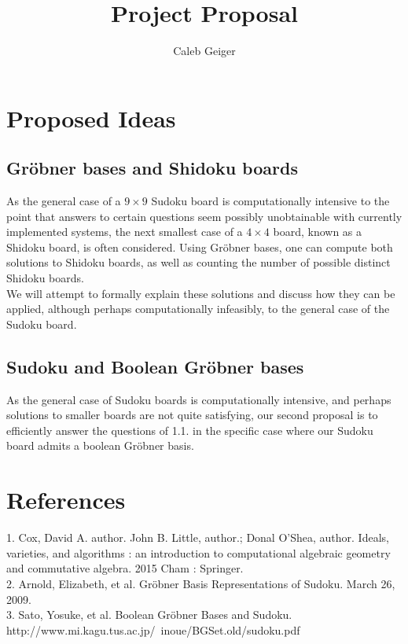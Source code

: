 \documentclass{article}
\title{Project Proposal}
\author{Caleb Geiger}
\begin{document}
\maketitle

\section{Proposed Ideas}
\subsection{Gr\" obner bases and Shidoku boards}
As the general case of a $9\times 9$ Sudoku board is computationally intensive to the point that answers to certain questions seem possibly unobtainable with currently implemented systems, the next smallest case of a $4\times 4$ board, known as a Shidoku board, is often considered. Using Gr\" obner bases, one can compute both solutions to Shidoku boards, as well as counting the number of possible distinct Shidoku boards.\\
We will attempt to formally explain these solutions and discuss how they can be applied, although perhaps computationally infeasibly, to the general case of the Sudoku board.
\subsection{Sudoku and Boolean Gr\" obner bases}
As the general case of Sudoku boards is computationally intensive, and perhaps solutions to smaller boards are not quite satisfying, our second proposal is to efficiently answer the questions of 1.1. in the specific case where our Sudoku board admits a boolean Gr\" obner basis.

\section{References}
1. Cox, David A. author. John B. Little, author.; Donal O'Shea, author. Ideals, varieties, and algorithms : an introduction to computational algebraic geometry and commutative algebra. 2015 Cham : Springer.\\
2. Arnold, Elizabeth, et al. Gr\" obner Basis Representations of Sudoku. March 26, 2009.\\
3. Sato, Yosuke, et al. Boolean Gr\" obner Bases and Sudoku. http://www.mi.kagu.tus.ac.jp/~inoue/BGSet.old/sudoku.pdf
\end{document}
